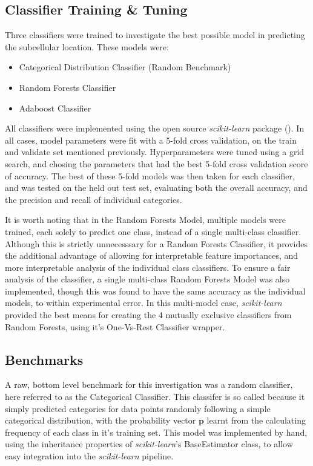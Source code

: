 \documentclass{bioinfo}
\begin{document}
\subsection{Classifier Training \& Tuning}

Three classifiers were trained to investigate the best possible model in predicting the subcellular location. These models were:

\begin{itemize}
  \item {Categorical Distribution Classifier (Random Benchmark)}
  \item {Random Forests Classifier}
  \item {Adaboost Classifier}
\end{itemize}

All classifiers were implemented using the open source \textit{scikit-learn} package (\cite{scikit-learn}). In all cases, model parameters were fit with a 5-fold cross validation, on the train and validate set mentioned previously. 
Hyperparameters were tuned using a grid search, and chosing the parameters that had the best 5-fold cross validation score of accuracy. 
The best of these 5-fold models was then taken for each classifier, and was tested on the held out test set, evaluating both the overall accuracy, and the precision and recall of individual categories.

It is worth noting that in the Random Forests Model, multiple models were trained, each solely to predict one class, instead of a single multi-class classifier. 
Although this is strictly unnecesssary for a Random Forests Classifier, it provides the additional advantage of allowing for interpretable feature importances, and more interpretable analysis of the individual class classifiers. 
To ensure a fair analysis of the classifier, a single multi-class Random Forests Model was also implemented, though this was found to have the same accuracy as the individual models, to within experimental error.
In this multi-model case, \textit{scikit-learn} provided the best means for creating the 4 mutually exclusive classifiers from Random Forests, using it's One-Vs-Rest Classifier wrapper.


\subsection{Benchmarks}

A raw, bottom level benchmark for this investigation was a random classifier, here referred to as the Categorical Classifier. 
This classifer is so called because it simply predicted categories for data points randomly following a simple categorical distribution, with the probability vector $\mathbf{p}$ learnt from the calculating frequency of each class in it's training set.
This model was implemented by hand, using the inheritance properties of \textit{scikit-learn}'s BaseEstimator class, to allow easy integration into the \textit{scikit-learn} pipeline.
\end{document}

